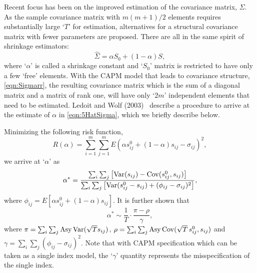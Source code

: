 Recent focus has been on the improved estimation of the covariance matrix, $\Sigma$. As the sample covariance matrix with $m(m+1)/2$ elements requires substantially large `$T$' for estimation, alternatives for a structural covariance matrix with fewer parameters are proposed. There are all in the same spirit of shrinkage estimators:
	\begin{equation} \label{eqn:5HatSigma}
	\hat{\Sigma}= \alpha S_0 + (1 - \alpha) S,
	\end{equation}
where `$\alpha$' is called a shrinkage constant and `$S_0$' matrix is restricted to have only a few `free' elements. With the CAPM model that leads to covariance structure, \eqref{eqn:Sigmarr}, the resulting covariance matrix which is the sum of a diagonal matrix and a matrix of rank one, will have only `$2m$' independent elements that need to be estimated. Ledoit and Wolf (2003)~\cite{wolf} describe a procedure to arrive at the estimate of $\alpha$ in \eqref{eqn:5HatSigma}, which we briefly describe below. 


Minimizing the following risk function,
	\begin{equation} \label{eqn:ralpha}
	R(\alpha)= \sum_{i=1}^m \sum_{j=1}^m E(\alpha s_{ij}^0 + (1-\alpha) s_{ij} - \sigma_{ij})^2,
	\end{equation}
we arrive at `$\alpha$' as
	\begin{equation}\label{eqn:bigalpha}
	\alpha^*= \dfrac{\sum_i \sum_{j} \left[ \var(s_{ij}) - \cov(s_{ij}^0, s_{ij}) \right]}{\sum_i \sum_j \left[ \var(s_{ij}^0 - s_{ij}) + (\phi_{ij} - \sigma_{ij})^2 \right]},
	\end{equation}
where $\phi_{ij}= E[\alpha s_{ij}^0 + (1 - \alpha) s_{ij}]$. It is further shown that
	\begin{equation}\label{eqn:alphastarsim}
	\alpha^* \sim \dfrac{1}{T} \cdot \dfrac{\pi - \rho}{\gamma},
	\end{equation}
where $\pi= \sum_i \sum_j \text{Asy} \operatorname{Var}(\sqrt{T} s_{ij})$, $\rho= \sum_i \sum_j \text{Asy} \operatorname{Cov}(\sqrt{T}\,s_{ij}^0, s_{ij})$ and $\gamma= \sum_i \sum_j (\phi_{ij} - \sigma_{ij})^2$. Note that with CAPM specification which can be taken as a single index model, the `$\gamma$' quantity represents the misspecification of the single index. 


